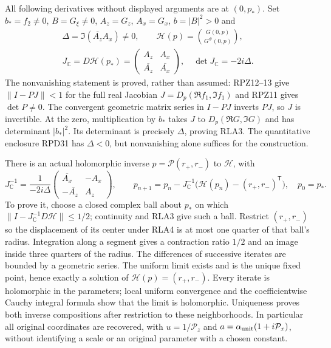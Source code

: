 All following derivatives without displayed arguments are at $(0,p_*)$.
Set $b_*=f_2\ne0$, $B=G_\xi\ne0$, $A_z=G_z$, $A_x=G_x$,
$b=|B|^2>0$ and
\[
 \begin{gathered}\Delta=\Im(\overline{A_z}A_x)\ne0,\qquad
 \mathcal H(p)=\binom{G(0,p)}{G^\#(0,p)},\\
 J_{\mathbb C}=D\mathcal H(p_*)=
 \begin{pmatrix}A_z&A_x\\\overline{A_z}&\overline{A_x}\end{pmatrix},
 \quad\det J_{\mathbb C}=-2i\Delta.
 \end{gathered}\tag{RLA3}
\]
The nonvanishing statement is proved, rather than assumed: RPZ12--13
give $\|I-PJ\|<1$ for the full real Jacobian
$J=D_p(\Re f_1,\Im f_1)$ and RPZ11 gives $\det P\ne0$.
The convergent geometric matrix series in $I-PJ$ inverts $PJ$,
so $J$ is invertible.  At the zero, multiplication by $b_*$ takes
$J$ to $D_p(\Re G,\Im G)$ and has determinant $|b_*|^2$.
Its determinant is precisely $\Delta$, proving RLA3.
The quantitative enclosure RPD31 has $\Delta<0$, but nonvanishing
alone suffices for the construction.

There is an actual holomorphic inverse $p=\mathcal P(r_+,r_-)$ to
$\mathcal H$, with
\[
 J_{\mathbb C}^{-1}
 =\frac1{-2i\Delta}
 \begin{pmatrix}\overline{A_x}&-A_x\\-\overline{A_z}&A_z\end{pmatrix},
 \qquad
 p_{n+1}=p_n-J_{\mathbb C}^{-1}
              \bigl(\mathcal H(p_n)-(r_+,r_-)^{\mathsf T}\bigr),
 \quad p_0=p_*.
 \tag{RLA4}
\]
To prove it, choose a closed complex ball about $p_*$ on which
$\|I-J_{\mathbb C}^{-1}D\mathcal H\|\le1/2$; continuity and RLA3
give such a ball.  Restrict $(r_+,r_-)$ so the displacement of its
center under RLA4 is at most one quarter of that ball's radius.
Integration along a segment gives a contraction ratio $1/2$ and
an image inside three quarters of the radius.  The differences of
successive iterates are bounded by a geometric series.  The uniform
limit exists and is the unique fixed point, hence exactly a solution
of $\mathcal H(p)=(r_+,r_-)$.
Every iterate is holomorphic in the parameters; local uniform
convergence and the coefficientwise Cauchy integral formula show that
the limit is holomorphic.  Uniqueness proves both inverse compositions
after restriction to these neighborhoods.  In particular all original
coordinates are recovered, with $u=1/\mathcal P_z$ and
$a=\alpha_{\rm unit}(1+i\mathcal P_x)$, without identifying a scale
or an original parameter with a chosen constant.

